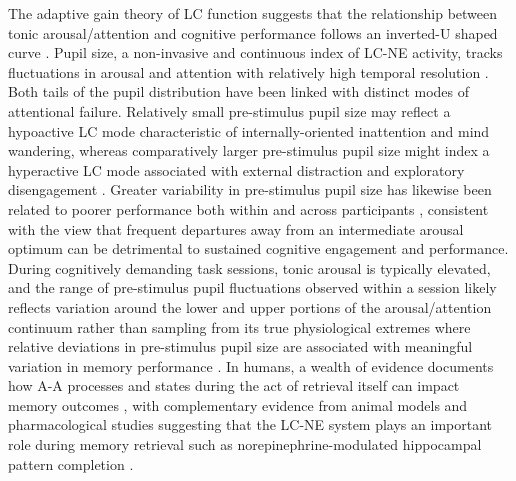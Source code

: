 The adaptive gain theory of LC function suggests that the relationship between tonic arousal/attention and cognitive performance follows an inverted-U shaped curve \parencite{astonjones2005integrative,astonjones2005adaptive,yerkes1908relation}. Pupil size, a non-invasive and continuous index of LC-NE activity, tracks fluctuations in arousal and attention with relatively high temporal resolution \parencite{beatty1982taskevoked,unsworth2018tracking,unsworth2017importance,eckstein2017beyond,konishi2017when}. Both tails of the pupil distribution have been linked with distinct modes of attentional failure. Relatively small pre-stimulus pupil size may reflect a hypoactive LC mode characteristic of internally-oriented inattention and mind wandering, whereas comparatively larger pre-stimulus pupil size might index a hyperactive LC mode associated with external distraction and exploratory disengagement \parencite{unsworth2018tracking,unsworth2016pupillary}. Greater variability in pre-stimulus pupil size has likewise been related to poorer performance both within and across participants \parencite{unsworth2018tracking,unsworth2017importance,robison2019pupillometry}, consistent with the view that frequent departures away from an intermediate arousal optimum can be detrimental to sustained cognitive engagement and performance. During cognitively demanding task sessions, tonic arousal is typically elevated, and the range of pre-stimulus pupil fluctuations observed within a session likely reflects variation around the lower and upper portions of the arousal/attention continuum rather than sampling from its true physiological extremes where relative deviations in pre-stimulus pupil size are associated with meaningful variation in memory performance \parencite{madore2022readiness,madore2020memory,sara2009locus,pitem2025predicting,kafkas2024eyes,kucewicz2018pupil,kuipers2022variations,mather2011arousal,clewett2018locus,sara2015locus}. In humans, a wealth of evidence documents how A-A processes and states during the act of retrieval itself can impact memory outcomes \parencite{cabeza2008parietal,mecklinger2010control,hutchinson2015increased,eichenbaum2017memory,sestieri2017contribution,rugg2018ventral,ciaramelli2020space,anderson2021active}, with complementary evidence from animal models and pharmacological studies suggesting that the LC-NE system plays an important role during memory retrieval such as norepinephrine-modulated hippocampal pattern completion \parencite{bliss1983reduction,hansen2015hippocampal}.

